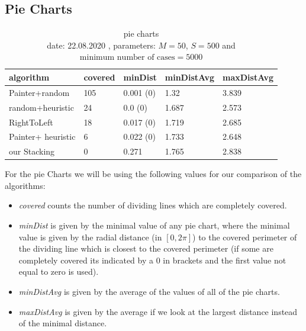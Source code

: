 \documentclass[a4paper,11pt]{article}
\begin{document}
\subsection*{Pie Charts}

\begin{table}[h]
  \begin{center}
    \begin{tabular}{| l || l | l | l | l |}
      \hline
      algorithm          & covered & minDist   & minDistAvg & maxDistAvg \\
      \hline
      Painter+random     & 105     & 0.001 (0) & 1.32       & 3.839      \\

      random+heuristic   & 24      & 0.0 (0)   & 1.687      & 2.573      \\

      RightToLeft        & 18      & 0.017 (0) & 1.719      & 2.685      \\

      Painter+ heuristic & 6       & 0.022 (0) & 1.733      & 2.648      \\

      our Stacking       & 0       & 0.271     & 1.765      & 2.838      \\

      \hline
    \end{tabular}
  \end{center}
  \caption{pie charts\\
    date: 22.08.2020  , parameters: $M=50$, $S=500$ and $\text{minimum number of cases}=5000$  }

\end{table}
For the pie Charts we will be using the following values for our comparison of the algorithms:
\begin{itemize}
  \item \textit{covered} counts the number of dividing lines which are completely covered.
  \item \textit{minDist} is given by the minimal value of any pie chart, where the minimal value is given by the radial distance (in $[0,2\pi]$) to the covered perimeter of the dividing line which is closest to the covered perimeter (if some are completely covered its indicated by a 0 in brackets and the first value not equal to zero is used).
  \item \textit{minDistAvg} is given by the average of the values of all of the pie charts.
  \item \textit{maxDistAvg} is given by the average if we look at the largest distance instead of the minimal distance.
\end{itemize}
\end{document}
